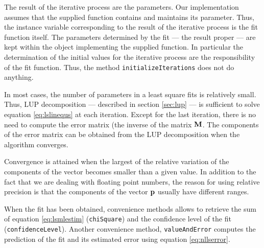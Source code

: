 \documentclass[twoside]{book}
\begin{document}
The result of the iterative process are the parameters. Our
implementation assumes that the supplied function contains and
maintains its parameter. Thus, the instance variable corresponding
to the result of the iterative process is the fit function itself.
The parameters determined by the fit --- the result proper --- are
kept within the object implementing the supplied function. In
particular the determination of the initial values for the
iterative process are the responsibility of the fit function.
Thus, the method {\tt initializeIterations} does not do anything.

In most cases, the number of parameters in a least square fits is
relatively small. Thus, LUP decomposition --- described in section
\ref{sec:lup} --- is sufficient to solve equation
\ref{eq:lslinequs} at each iteration. Except for the last
iteration, there is no need to compute the error matrix (the
inverse of the matrix ${\bf M}$. The components of the error
matrix can be obtained from the LUP decomposition when the
algorithm converges.

Convergence is attained when the largest of the relative variation
of the components of the vector becomes smaller than a given
value. In addition to the fact that we are dealing with floating
point numbers, the reason for using relative precision is that the
components of the vector ${\bf p}$ usually have different ranges.

When the fit has been obtained, convenience methods allows to
retrieve the sum of equation \ref{eq:lsmlestim} ({\tt chiSquare})
and the confidence level of the fit ({\tt confidenceLevel}).
Another convenience method, {\tt valueAndError} computes the
prediction of the fit and its estimated error using equation
\ref{eq:nllserror}.
\end{document}
